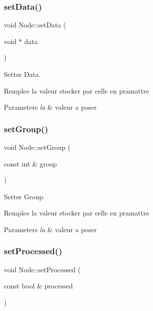 \subsubsection{\texorpdfstring{set\+Data()}{setData()}}
{\footnotesize\ttfamily void Node\+::set\+Data (\begin{DoxyParamCaption}\item[{void $\ast$}]{data }\end{DoxyParamCaption})}



Setter Data. 

Remplce la valeur stocker par celle en pramattre


\begin{DoxyParams}{Parameters}
{\em la} & valeur a poser \\
\hline
\end{DoxyParams}
\mbox{\label{class_node_aa276d0e58d6b8e1a5c90634a1dcc10dd}} 
\subsubsection{\texorpdfstring{set\+Group()}{setGroup()}}
{\footnotesize\ttfamily void Node\+::set\+Group (\begin{DoxyParamCaption}\item[{const int \&}]{group }\end{DoxyParamCaption})}



Setter Group. 

Remplce la valeur stocker par celle en pramattre


\begin{DoxyParams}{Parameters}
{\em la} & valeur a poser \\
\hline
\end{DoxyParams}
\mbox{\label{class_node_a711384cef3ba7e7927bdad163ef66c26}} 
\subsubsection{\texorpdfstring{set\+Processed()}{setProcessed()}}
{\footnotesize\ttfamily void Node\+::set\+Processed (\begin{DoxyParamCaption}\item[{const bool \&}]{processed }\end{DoxyParamCaption})}



